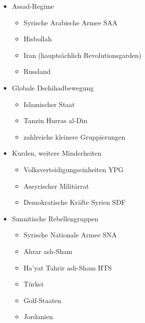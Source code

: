 {}\documentclass[a4paper]{article}
\providecommand{\tightlist}{\setlength{\itemsep}{1mm}\setlength{\parskip}{1mm}}
\begin{document}
\begin{itemize}
	\tightlist
	\item
	      Assad-Regime

	      \begin{itemize}
		      \tightlist
		      \item
		            Syrische Arabische Armee SAA
		      \item
		            Hisbollah
		      \item
		            Iran (hauptsächlich Revolutionsgarden)
		      \item
		            Russland
	      \end{itemize}
	\item
	      Globale Dschihadbewegung

	      \begin{itemize}
		      \tightlist
		      \item
		            Islamischer Staat
		      \item
		            Tanzin Hurras al-Din
		      \item
		            zahlreiche kleinere Gruppierungen
	      \end{itemize}
	\item
	      Kurden, weitere Minderheiten

	      \begin{itemize}
		      \tightlist
		      \item
		            Volksverteidigungseinheiten YPG
		      \item
		            Assyrischer Militärrat
		      \item
		            Demokratische Kräfte Syrien SDF
	      \end{itemize}
	\item
	      Sunnitische Rebellengruppen

	      \begin{itemize}
		      \tightlist
		      \item
		            Syrische Nationale Armee SNA
		      \item
		            Ahrar ash-Sham
		      \item
		            Ha'yat Tahrir ash-Sham HTS
		      \item
		            Türkei
		      \item
		            Golf-Staaten
		      \item
		            Jordanien
	      \end{itemize}
\end{itemize}
\end{document}
